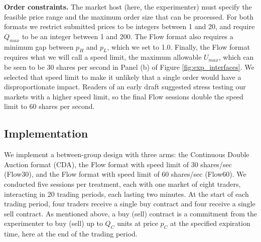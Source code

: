 \documentclass[12pt]{article}
\begin{document}
\bigskip
\noindent
\textbf{Order constraints.} 
The market host (here, the experimenter) must specify the feasible price range and the maximum order size that can be processed.
For both formats we restrict submitted prices to be integers between 1 and 20, and require $Q_{max}$ to be an integer between 1 and 200. 
The Flow format also requires a minimum gap between $p_H$ and $p_L$, which we set to 1.0. 
Finally, the Flow format requires what we will call a speed limit, the maximum allowable $U_{max}$, which can be seen to be 30 shares per second in Panel (b) of Figure \ref{fig:exp_interfaces}. 
We selected that speed limit to make it unlikely that a single order would have a disproportionate impact.
Readers of an early draft suggested stress testing our markets with a higher speed limit, so the final Flow sessions double the speed limit to 60 shares per second.


\subsection{Implementation}\label{sect:design}

{We implement a between-group design with three arms: the Continuous Double Auction format (CDA), the Flow format with speed limit of 30 shares/sec (Flow30), and the Flow format with speed limit of 60 shares/sec (Flow60). }
We conducted five sessions per treatment, each with one market of eight traders, interacting in 20 trading periods, each lasting two minutes. 
At the start of each trading period,  four traders receive a single buy contract and four receive a single sell contract. %
As mentioned above, %
a buy (sell) contract is a commitment from the experimenter to buy (sell) up to $Q_{C}$ units at price $p_{C}$ at the specified expiration time, here at the end of the trading period. %
\end{document}
